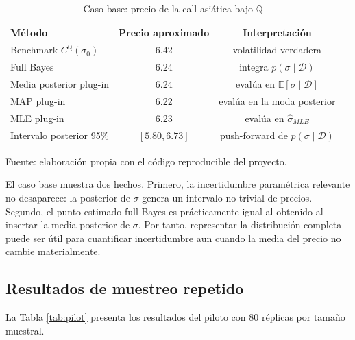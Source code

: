 \documentclass[12pt,letterpaper]{article}
\newcommand{\Qmeasure}{\mathbb{Q}}
\newcommand{\E}{\mathbb{E}}
\begin{document}
\begin{table}[H]
\centering
\caption{Caso base: precio de la call asiática bajo $\Qmeasure$}
\label{tab:baseline}
\begin{tabular}{lcc}
\toprule
Método & Precio aproximado & Interpretación \\
\midrule
Benchmark $C^{\Qmeasure}(\sigma_0)$ & 6.42 & volatilidad verdadera \\
Full Bayes & 6.24 & integra $p(\sigma\mid\mathcal D)$ \\
Media posterior plug-in & 6.24 & evalúa en $\E[\sigma\mid\mathcal D]$ \\
MAP plug-in & 6.22 & evalúa en la moda posterior \\
MLE plug-in & 6.23 & evalúa en $\widehat\sigma_{MLE}$ \\
Intervalo posterior 95\% & $[5.80,6.73]$ & push-forward de $p(\sigma\mid\mathcal D)$ \\
\bottomrule
\end{tabular}

\vspace{0.15cm}
\footnotesize Fuente: elaboración propia con el código reproducible del proyecto.
\end{table}

El caso base muestra dos hechos. Primero, la incertidumbre paramétrica relevante no desaparece: la posterior de $\sigma$ genera un intervalo no trivial de precios. Segundo, el punto estimado full Bayes es prácticamente igual al obtenido al insertar la media posterior de $\sigma$. Por tanto, representar la distribución completa puede ser útil para cuantificar incertidumbre aun cuando la media del precio no cambie materialmente.

\subsection{Resultados de muestreo repetido}

La Tabla \ref{tab:pilot} presenta los resultados del piloto con 80 réplicas por tamaño muestral.
\end{document}
